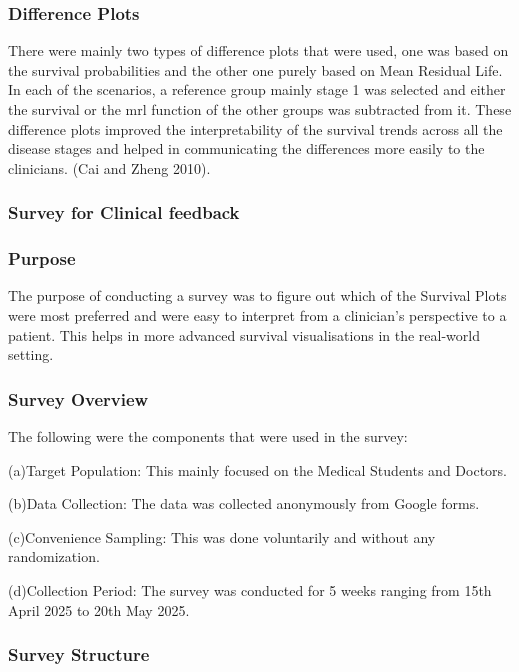 \documentclass{article}
\begin{document}
\subsubsection{Difference Plots}\label{difference-plots}

There were mainly two types of difference plots that were used, one was based on the survival probabilities and the other one purely based on Mean Residual Life. In each of the scenarios, a reference group mainly stage 1 was selected and either the survival or the mrl function of the other groups was subtracted from it. These difference plots improved the interpretability of the survival trends across all the disease stages and helped in communicating the differences more easily to the clinicians. (Cai and Zheng 2010).

\subsubsection{Survey for Clinical feedback}\label{survey-for-clinical-feedback}

\subsubsection{Purpose}\label{purpose}

The purpose of conducting a survey was to figure out which of the Survival Plots were most preferred and were easy to interpret from a clinician's perspective to a patient. This helps in more advanced survival visualisations in the real-world setting.

\subsubsection{Survey Overview}\label{survey-overview}

The following were the components that were used in the survey:

(a)Target Population: This mainly focused on the Medical Students and Doctors.

(b)Data Collection: The data was collected anonymously from Google forms.

(c)Convenience Sampling: This was done voluntarily and without any randomization.

(d)Collection Period: The survey was conducted for 5 weeks ranging from 15th April 2025 to 20th May 2025.

\subsubsection{Survey Structure}\label{survey-structure}
\end{document}
